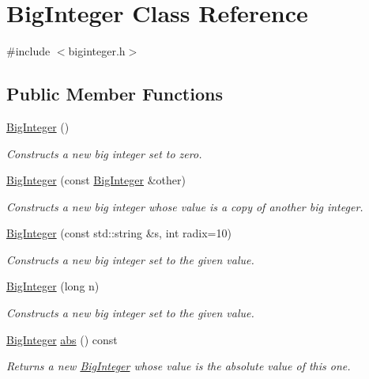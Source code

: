 \hypertarget{classBigInteger}{}\section{Big\+Integer Class Reference}
\label{classBigInteger}


{\ttfamily \#include $<$biginteger.\+h$>$}

\subsection*{Public Member Functions}
\begin{DoxyCompactItemize}
\item 
\mbox{\hyperlink{classBigInteger_a49b951f4a6687820741740806aa04715}{Big\+Integer}} ()
\begin{DoxyCompactList}\small\item\em Constructs a new big integer set to zero. \end{DoxyCompactList}\item 
\mbox{\hyperlink{classBigInteger_a2b2f122dc8513adcbf68d8b329834c9a}{Big\+Integer}} (const \mbox{\hyperlink{classBigInteger}{Big\+Integer}} \&other)
\begin{DoxyCompactList}\small\item\em Constructs a new big integer whose value is a copy of another big integer. \end{DoxyCompactList}\item 
\mbox{\hyperlink{classBigInteger_aa54e846a6f657634a4554b9540b339e4}{Big\+Integer}} (const std\+::string \&s, int radix=10)
\begin{DoxyCompactList}\small\item\em Constructs a new big integer set to the given value. \end{DoxyCompactList}\item 
\mbox{\hyperlink{classBigInteger_a647b32454d89f386f4e8d3137d4e5526}{Big\+Integer}} (long n)
\begin{DoxyCompactList}\small\item\em Constructs a new big integer set to the given value. \end{DoxyCompactList}\item 
\mbox{\hyperlink{classBigInteger}{Big\+Integer}} \mbox{\hyperlink{classBigInteger_aa60f0a3be5766293b78752ac6d7430fe}{abs}} () const
\begin{DoxyCompactList}\small\item\em Returns a new \mbox{\hyperlink{classBigInteger}{Big\+Integer}} whose value is the absolute value of this one. \end{DoxyCompactList}\item 

\end{DoxyCompactItemize}
